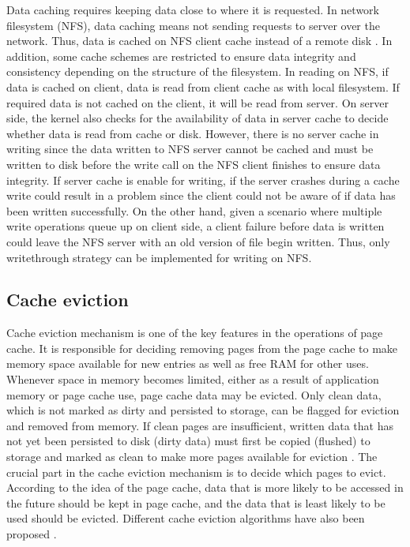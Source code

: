 Data caching requires keeping data close to where it is requested. 
In network filesystem (NFS), data caching means not sending requests 
to server over the network. Thus, data is cached on NFS client cache instead 
of a remote disk \cite{eisler2001managing}. 
In addition, some cache schemes are restricted to ensure data integrity and 
consistency depending on the structure of the filesystem.
In reading on NFS, if data is cached on client, data is read from client cache 
as with local filesystem. If required data is not cached on the client, 
it will be read from server. On server side, the kernel also checks for the 
availability of data in server cache to decide whether data is read from 
cache or disk. 
However, there is no server cache in writing since the data written to 
NFS server cannot be cached and must be written to disk before the write 
call on the NFS client finishes to ensure data integrity. 
If server cache is enable for writing, if the server crashes during a cache 
write could result in a problem since the client could not be aware of if 
data has been written successfully. 
On the other hand, given a scenario where multiple write operations 
queue up on client side, a client failure before data is written could leave 
the NFS server with an old version of file begin written. 
Thus, only writethrough strategy can be implemented for writing on NFS. 

\subsection{Cache eviction}

Cache eviction mechanism is one of the key features in the operations of 
page cache. 
It is responsible for deciding removing pages from the page cache to make 
memory space available for new entries as well as free RAM for other uses. 
Whenever space in memory becomes limited, either as a result of application 
memory or page cache use, page cache data may be evicted. 
Only clean data, which is not marked as dirty and persisted to storage, can be 
flagged for eviction and removed from memory. 
If clean pages are insufficient, written data that has not yet been persisted 
to disk (dirty data) must first be copied (flushed) to storage and marked as 
clean to make more pages available for eviction 
\cite{linuxdev3rd2010,bovet2005understanding}. 
The crucial part in the cache eviction mechanism is to decide which pages 
to evict. According to the idea of the page cache, data that is more likely 
to be accessed in the future should be kept in page cache, and the data 
that is least likely to be used should be evicted. 
Different cache eviction algorithms have also been proposed
\cite{chavan2011comparison}.

